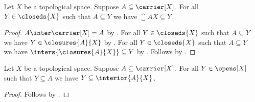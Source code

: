\begin{proposition}\label{closure_is_minimal_closed_set}
    Let $X$ be a topological space.
    Suppose $A \subseteq \carrier[X]$.
    For all $Y \in \closeds{X}$ such that $A \subseteq Y$ we have $\closure{A}{X} \subseteq Y$.
\end{proposition}
\begin{proof}
    $A\inter\carrier[X]=A$
        by .
    For all $Y\in\closeds{X}$ such that $A\subseteq Y$ we have
        $Y\in\closures{A}{X}$ by .
    For all $Y\in\closeds{X}$ such that $A\subseteq Y$ we have
        $\inters{\closures{A}{X}}\subseteq Y$
        by .
    Follows by .
\end{proof}

\begin{proposition}\label{interior_is_maximal}
    Let $X$ be a topological space.
    Suppose $A \subseteq \carrier[X]$.
    For all $Y \in \opens[X]$ such that $Y \subseteq A$ we have $Y \subseteq \interior{A}{X}$.
\end{proposition}
\begin{proof}
    Follows by .
\end{proof}

